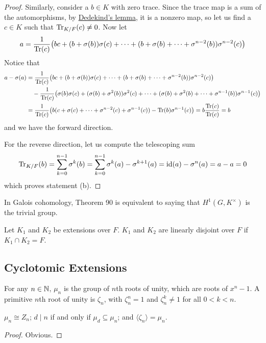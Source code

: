\begin{proof}
    Similarly, consider a \(b \in K\) with zero trace.
    Since the trace map is a sum of the automorphisms,
    by \hyperref[lem:dedekind]{Dedekind's lemma}, it is a nonzero map,
    so let us find a \(c \in K\) such that \(\Tr_{K/F}(c) \neq 0\).
    Now let
    \begin{equation*}
        a = \frac{1}{\Tr(c)}\pqty{bc + (b+\sigma(b))\sigma(c) + \cdots + (b+\sigma(b)+\cdots+\sigma^{n-2}(b))\sigma^{n-2}(c)}
    \end{equation*}
    Notice that
    \begin{align*}
        a - \sigma(a) &= \frac{1}{\Tr(c)}\pqty{bc + (b+\sigma(b))\sigma(c) + \cdots + (b+\sigma(b)+\cdots+\sigma^{n-2}(b))\sigma^{n-2}(c)} \\
        &\quad - \frac{1}{\Tr(c)}\pqty{\sigma(b)\sigma(c) + (\sigma(b)+\sigma^2(b))\sigma^2(c) + \cdots + (\sigma(b)+\sigma^2(b)+\cdots+\sigma^{n-1}(b))\sigma^{n-1}(c)} \\
        &= \frac{1}{\Tr(c)}\pqty{b(c + \sigma(c) + \cdots + \sigma^{n-2}(c) + \sigma^{n-1}(c)) - \Tr(b)\sigma^{n-1}(c)}
        = b \frac{\Tr(c)}{\Tr(c)} = b
    \end{align*}
    and we have the forward direction.

    For the reverse direction, let us compute the telescoping sum
    \begin{equation*}
        \Tr_{K/F}(b) = \sum_{k=0}^{n-1} \sigma^k(b) = \sum_{k=0}^{n-1} \sigma^k(a) - \sigma^{k+1}(a)
        = \operatorname{id}(a) - \sigma^n(a) = a - a = 0
    \end{equation*}
    which proves statement (b).
\end{proof}
\begin{remark}
    In Galois cohomology, Theorem 90 is equivalent to saying that \(H^1(G,K^\times)\) is the trivial group.
\end{remark}

\begin{definition}
    Let \(K_1\) and \(K_2\) be extensions over \(F\).
    \(K_1\) and \(K_2\) are linearly disjoint over \(F\)
    if \(K_1 \cap K_2 = F\).
\end{definition}

\subsection*{Cyclotomic Extensions}

\begin{definition}
    For any \(n \in \mathbb{N}\), \(\mu_n\) is the group of \(n\)th roots of unity,
    which are roots of \(x^n - 1\).
    A primitive \(n\)th root of unity is \(\zeta_n\),
    with \(\zeta_n^n = 1\) and \(\zeta_n^k \neq 1\) for all \(0 < k < n\).
\end{definition}
\begin{proposition}
    \(\mu_n \cong Z_n\);
    \(d \mid n\) if and only if \(\mu_d \subseteq \mu_n\);
    and \(\langle \zeta_n \rangle = \mu_n\).
\end{proposition}
\begin{proof}
    Obvious.
\end{proof}

